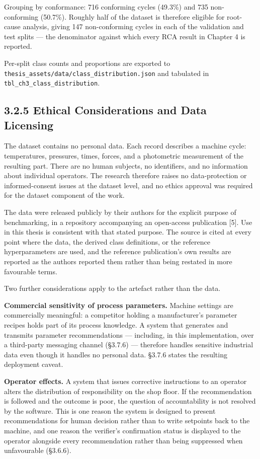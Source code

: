 Grouping by conformance: 716 conforming cycles (49.3\%) and 735 non-conforming (50.7\%). Roughly half of the dataset is therefore eligible for root-cause analysis, giving 147 non-conforming cycles in each of the validation and test splits --- the denominator against which every RCA result in Chapter 4 is reported.

Per-split class counts and proportions are exported to \texttt{thesis\_assets/data/class\_distribution.json} and tabulated in \texttt{tbl\_ch3\_class\_distribution}.

\hypertarget{ethical-considerations-and-data-licensing}{%
\subsection{3.2.5 Ethical Considerations and Data Licensing}\label{ethical-considerations-and-data-licensing}}

The dataset contains no personal data. Each record describes a machine cycle: temperatures, pressures, times, forces, and a photometric measurement of the resulting part. There are no human subjects, no identifiers, and no information about individual operators. The research therefore raises no data-protection or informed-consent issues at the dataset level, and no ethics approval was required for the dataset component of the work.

The data were released publicly by their authors for the explicit purpose of benchmarking, in a repository accompanying an open-access publication {[}5{]}. Use in this thesis is consistent with that stated purpose. The source is cited at every point where the data, the derived class definitions, or the reference hyperparameters are used, and the reference publication's own results are reported as the authors reported them rather than being restated in more favourable terms.

Two further considerations apply to the artefact rather than the data.

\textbf{Commercial sensitivity of process parameters.} Machine settings are commercially meaningful: a competitor holding a manufacturer's parameter recipes holds part of its process knowledge. A system that generates and transmits parameter recommendations --- including, in this implementation, over a third-party messaging channel (§3.7.6) --- therefore handles sensitive industrial data even though it handles no personal data. §3.7.6 states the resulting deployment caveat.

\textbf{Operator effects.} A system that issues corrective instructions to an operator alters the distribution of responsibility on the shop floor. If the recommendation is followed and the outcome is poor, the question of accountability is not resolved by the software. This is one reason the system is designed to present recommendations for human decision rather than to write setpoints back to the machine, and one reason the verifier's confirmation status is displayed to the operator alongside every recommendation rather than being suppressed when unfavourable (§3.6.6).

